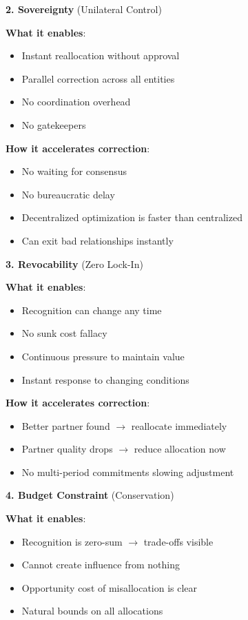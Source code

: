 \documentclass[11pt,a4paper]{article}
\theoremstyle{definition}
\theoremstyle{remark}
\begin{document}
\textbf{2. Sovereignty} (Unilateral Control)

\textbf{What it enables}:
\begin{itemize}
\item Instant reallocation without approval
\item Parallel correction across all entities
\item No coordination overhead
\item No gatekeepers
\end{itemize}

\textbf{How it accelerates correction}:
\begin{itemize}
\item No waiting for consensus
\item No bureaucratic delay
\item Decentralized optimization is faster than centralized
\item Can exit bad relationships instantly
\end{itemize}

\textbf{3. Revocability} (Zero Lock-In)

\textbf{What it enables}:
\begin{itemize}
\item Recognition can change any time
\item No sunk cost fallacy
\item Continuous pressure to maintain value
\item Instant response to changing conditions
\end{itemize}

\textbf{How it accelerates correction}:
\begin{itemize}
\item Better partner found $\rightarrow$ reallocate immediately
\item Partner quality drops $\rightarrow$ reduce allocation now
\item No multi-period commitments slowing adjustment
\end{itemize}

\textbf{4. Budget Constraint} (Conservation)

\textbf{What it enables}:
\begin{itemize}
\item Recognition is zero-sum $\rightarrow$ trade-offs visible
\item Cannot create influence from nothing
\item Opportunity cost of misallocation is clear
\item Natural bounds on all allocations
\end{itemize}
\end{document}
